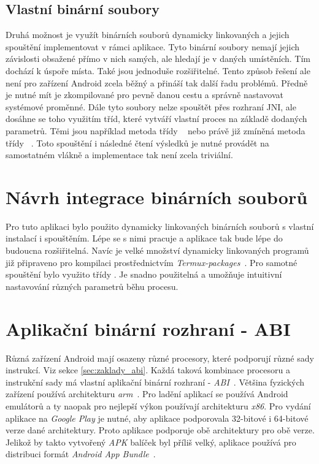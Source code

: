    \newpage
    \subsection{Vlastní binární soubory}\label{subsec:dyn_binaries}
    Druhá možnost je využít binárních souborů dynamicky linkovaných a jejich spouštění implementovat v rámci aplikace. Tyto binární soubory nemají jejich závislosti obsažené přímo v nich samých, ale hledají je v daných umístěních. Tím dochází k úspoře místa. Také jsou jednoduše rozšiřitelné. Tento způsob řešení ale není pro zařízení Android zcela běžný a přináší tak další řadu problémů. Předně je nutné mít je zkompilované pro pevně danou cestu a správně nastavovat systémové proměnné. Dále tyto soubory nelze spouštět přes rozhraní JNI, ale dosáhne se toho využitím tříd, které vytváří vlastní proces na základě dodaných parametrů. Těmi jsou například metoda  třídy ~ nebo právě již zmíněná metoda  třídy ~. Toto spouštění i následné čtení výsledků je nutné provádět na samostatném vlákně a implementace tak není zcela triviální.

\section{Návrh integrace binárních souborů}
Pro tuto aplikaci bylo použito dynamicky linkovaných binárních souborů s vlastní instalací i spouštěním. Lépe se s nimi pracuje a aplikace tak bude lépe do budoucna rozšiřitelná. Navíc je velké množství dynamicky linkovaných programů již připraveno pro kompilaci prostřednictvím \emph{Termux-packages}~. Pro samotné spouštění bylo využito třídy . Je snadno použitelná a umožňuje intuitivní nastavování různých parametrů běhu procesu.

\section{Aplikační binární rozhraní - ABI}
 Různá zařízení Android mají osazeny různé procesory, které podporují různé sady instrukcí. Viz sekce \ref{sec:zaklady_abi}. Každá taková kombinace procesoru a instrukční sady má vlastní aplikační binární rozhraní - \emph{ABI}~. Většina fyzických zařízení používá architekturu \emph{arm}~. Pro ladění aplikací se používá Android emulátorů a ty naopak pro nejlepší výkon používají architekturu \emph{x86}. Pro vydání aplikace na \emph{Google Play} je nutné, aby aplikace podporovala 32-bitové i 64-bitové verze dané architektury. Proto aplikace podporuje obě architektury pro obě verze. Jelikož by takto vytvořený \emph{APK} balíček byl příliš velký, aplikace používá pro distribuci formát \emph{Android App Bundle}~.
    
